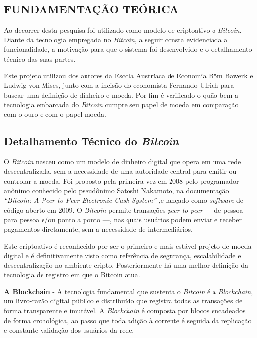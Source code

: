 \documentclass[article,12pt,oneside,a4paper,english,brazil]{unifil}
\begin{document}
\begin{Spacing}{1.5}
\section*{FUNDAMENTAÇÃO TEÓRICA}

Ao decorrer desta pesquisa foi utilizado como modelo de criptoativo o \textit{Bitcoin}. Diante da tecnologia empregada no \textit{Bitcoin}, a seguir consta evidenciada a funcionalidade, a motivação para que o sistema foi desenvolvido e o detalhamento técnico das suas partes.

Este projeto utilizou dos autores da Escola Austríaca de Economia Böm Bawerk e  Ludwig von Mises, junto com a incisão do economista Fernando Ulrich para buscar uma definição de dinheiro e moeda. Por fim é verificado o quão bem a tecnologia embarcada do \textit{Bitcoin} cumpre seu papel de moeda em comparação com o ouro e com o papel-moeda. 

\subsection*{Detalhamento Técnico do \textit{Bitcoin}} \label{sec:bitcoin}

O \textit{Bitcoin} nasceu como um modelo de dinheiro digital que opera em uma rede descentralizada, sem a necessidade de uma autoridade central para emitir ou controlar a moeda. Foi proposto pela primeira vez em 2008 pelo programador anônimo conhecido pelo pseudônimo Satoshi Nakamoto, na documentação \textit{``Bitcoin: A Peer-to-Peer Electronic Cash System''} \cite{Nakamoto2009} ,e lançado como \textit{software} de código aberto em 2009. O \textit{Bitcoin} permite transações \textit{peer-to-peer} — de pessoa para pessoa e/ou ponto a ponto —, nas quais usuários podem enviar e receber pagamentos diretamente, sem a necessidade de intermediários.

Este criptoativo é reconhecido por ser o primeiro e mais estável projeto de moeda digital e é definitivamente visto como referência de segurança, escalabilidade e descentralização no ambiente cripto. Posteriormente há uma melhor definição da tecnologia de registro em que o Bitcoin atua.

\textbf{A Blockchain} \label{subsec:blockchain} - A tecnologia fundamental que sustenta o \textit{Bitcoin} é a \textit{Blockchain}, um livro-razão digital público e distribuído que registra todas as transações de forma transparente e imutável. A \textit{Blockchain} é composta por blocos encadeados de forma cronológica, ao passo que toda adição à corrente é seguida da replicação e constante validação dos usuários da rede.


\end{Spacing}
\end{document}
